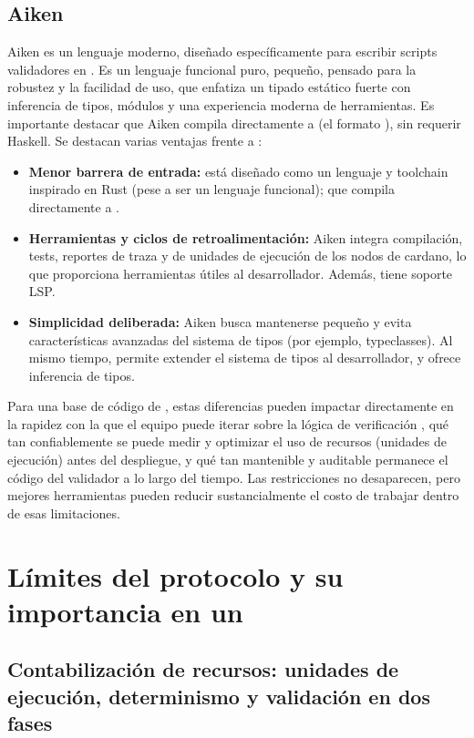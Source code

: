 \subsection{Aiken}

Aiken \cite{aiken2026} es un lenguaje moderno, diseñado específicamente para escribir scripts validadores en \Cardano. Es un lenguaje funcional puro, pequeño, pensado para la robustez y la facilidad de uso, que enfatiza un tipado estático fuerte con inferencia de tipos, módulos y una experiencia moderna de herramientas. Es importante destacar que Aiken compila directamente a \UPLC (el formato \Onchain), sin requerir Haskell. Se destacan varias ventajas frente a \Plutus:

\begin{itemize}[noitemsep]
	\item \textbf{Menor barrera de entrada:} está diseñado como un lenguaje y toolchain inspirado en Rust (pese a ser un lenguaje funcional); que compila directamente a \UPLC.
	\item \textbf{Herramientas y ciclos de retroalimentación:} Aiken integra compilación, tests, reportes de traza y de unidades de ejecución de los nodos de cardano, lo que proporciona herramientas útiles al desarrollador. Además, tiene soporte LSP.
	\item \textbf{Simplicidad deliberada:} Aiken busca mantenerse pequeño y evita características avanzadas del sistema de tipos (por ejemplo, typeclasses). Al mismo tiempo, permite extender el sistema de tipos al desarrollador, y ofrece inferencia de tipos.
\end{itemize}

Para una base de código de \zkBridge, estas diferencias pueden impactar directamente en la rapidez con la que el equipo puede iterar sobre la lógica de verificación \Onchain, qué tan confiablemente se puede medir y optimizar el uso de recursos (unidades de ejecución) antes del despliegue, y qué tan mantenible y auditable permanece el código del validador a lo largo del tiempo. Las restricciones \Onchain no desaparecen, pero mejores herramientas pueden reducir sustancialmente el costo de trabajar dentro de esas limitaciones.

\section{Límites del protocolo y su importancia en un \zkBridge}

\subsection{Contabilización de recursos: unidades de ejecución, determinismo y validación en dos fases}

